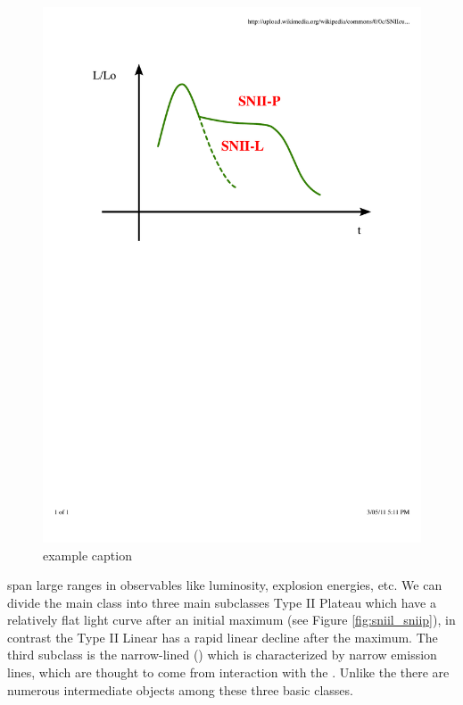 \begin{figure}[htbp] %
   \centering
   \includegraphics[width=\textwidth]{chapter1/plots/snii_lc_comparison.pdf} 
   \caption{example caption}
   \label{fig:snii_lc_comparison}
\end{figure}
\sneii span large ranges in observables like luminosity, explosion energies, etc. We can divide the main class into three main subclasses Type II Plateau \citet[\sniip][]{1979A&A....72..287B} which have a relatively flat light curve after an initial maximum (see Figure \ref{fig:sniil_sniip}), in contrast the Type II Linear \cite[\sniil][]{1990MNRAS.244..269S} has a rapid linear decline after the maximum. The third subclass is the narrow-lined \snii (\sniin) which is characterized by narrow emission lines, which are thought to come from interaction with the \csm. Unlike the \sneia there are numerous intermediate objects among these three basic classes. 

